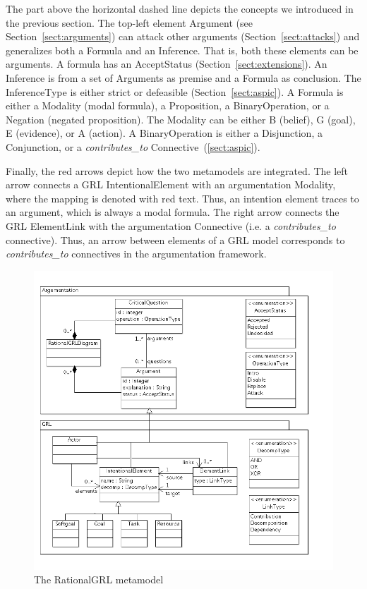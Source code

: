 The part above the horizontal dashed line depicts the concepts we introduced in the previous section. The top-left element \textsf{Argument} (see Section~\ref{sect:arguments}) can attack other arguments (Section~\ref{sect:attacks}) and generalizes both a \textsf{Formula} and an \textsf{Inference}. That is, both these elements can be arguments. A formula has an \textsf{AcceptStatus} (Section~\ref{sect:extensions}). An \textsf{Inference} is from a set of \textsf{Arguments} as premise and a \textsf{Formula} as conclusion. The \textsf{InferenceType} is either strict or defeasible (Section~\ref{sect:aspic}). A \textsf{Formula} is either a \textsf{Modality} (modal formula), a \textsf{Proposition}, a \textsf{BinaryOperation}, or a \textsf{Negation} (negated proposition). The \textsf{Modality} can be either B (belief), G (goal), E (evidence), or A (action). A \textsf{BinaryOperation} is either a \textsf{Disjunction}, a \textsf{Conjunction}, or a \emph{contributes\_to} \textsf{Connective}~(\ref{sect:aspic}).

Finally, the red arrows depict how the two metamodels are integrated. The left arrow connects a GRL \textsf{IntentionalElement} with an argumentation \textsf{Modality}, where the mapping is denoted with red text. Thus, an intention element traces to an argument, which is always a modal formula. The right arrow connects the GRL \textsf{ElementLink} with the argumentation \textsf{Connective} (i.e. a \emph{contributes\_to} connective). Thus, an arrow between elements of a GRL model corresponds to \emph{contributes\_to} connectives in the argumentation framework.

\begin{figure}[h!]
\includegraphics[scale=0.61]{metamodel/metamodel}
\caption{The RationalGRL metamodel}
\label{fig:metamodel}
\end{figure}